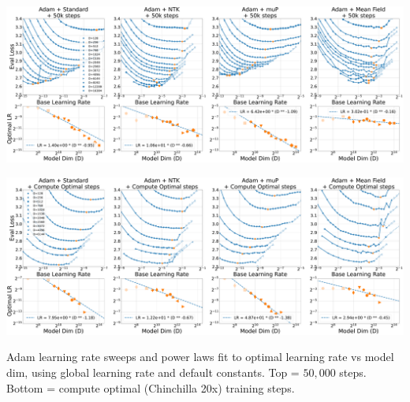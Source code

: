 \thispagestyle{plain}
\begin{SidewaysFigure}
\\
\includegraphics[width=0.98\linewidth]{icml2024/figures/lr_sweeps/compute_opt_appendix/adam+50k_steps.pdf}

\figvspace

\includegraphics[width=0.98\linewidth]{icml2024/figures/lr_sweeps/compute_opt_appendix/adam+compute_opt.pdf}
\caption{Adam learning rate sweeps and power laws fit to optimal learning rate vs model dim, using global learning rate and default constants. Top = $50{,}000$ steps. Bottom = compute optimal (Chinchilla 20x) training steps.}
\label{fig:app_compute_opt_adam}
\end{SidewaysFigure}
\clearpage

